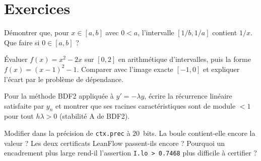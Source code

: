 \section{Exercices}\label{appD:sec:exos}

\begin{exercise}
Démontrer que, pour $x\in[a,b]$ avec $0<a$, l'intervalle $[1/b,1/a]$ contient $1/x$. Que faire si $0\in[a,b]$ ?
\end{exercise}

\begin{exercise}
Évaluer $f(x)=x^2-2x$ sur $[0,2]$ en arithmétique d'intervalles, puis la forme $f(x)=(x-1)^2-1$. Comparer avec
l'image exacte $[-1,0]$ et expliquer l'écart par le problème de dépendance.
\end{exercise}

\begin{exercise}
Pour la méthode BDF2 appliquée à $y'=-\lambda y$, écrire la récurrence linéaire satisfaite par $y_n$ et montrer que
ses racines caractéristiques sont de module $<1$ pour tout $h\lambda>0$ (stabilité A de BDF2).
\end{exercise}

\begin{exercise}
Modifier dans  la précision de \texttt{ctx.prec} à $20$~bits. La boule contient-elle
encore la valeur ? Les deux certificats LeanFlow passent-ils encore ? Pourquoi un encadrement plus large rend-il
l'assertion \texttt{I.lo > 0.7468} plus difficile à certifier ?
\end{exercise}
